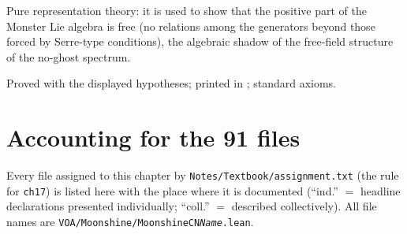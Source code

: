 \begin{physics}
Pure representation theory: it is used to show that the positive part of the Monster Lie algebra is free (no relations
among the generators beyond those forced by Serre-type conditions), the algebraic shadow of the free-field structure of
the no-ghost spectrum.
\end{physics}

\begin{status}
Proved with the displayed hypotheses; printed in ; standard axioms.
\end{status}

\section{Accounting for the 91 files}\label{ch17:sec:files}

Every file assigned to this chapter by \texttt{Notes/Textbook/assignment.txt} (the rule for \texttt{ch17}) is listed here with
the place where it is documented (``ind.'' $=$ headline declarations presented individually; ``coll.'' $=$ described
collectively).  All file names are \texttt{VOA/Moonshine/MoonshineCN\textit{Name}.lean}.

